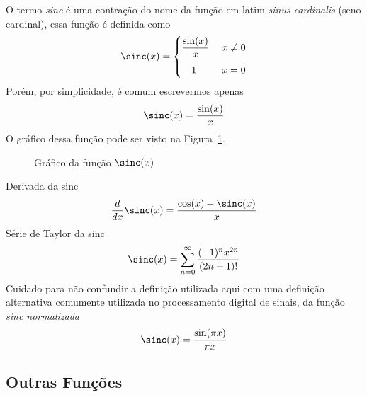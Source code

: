 O termo \emph{sinc} é uma contração do nome da função em latim
\textit{sinus cardinalis} (seno cardinal), essa função é definida como
\begin{equation}
  \label{eq:funcao_sinc}
  \sinc(x) = \begin{cases}
                \dfrac{\sin(x)}{x} & \; x \neq 0 \\[3mm]
                \quad 1            & \; x = 0
             \end{cases}
\end{equation}
Porém, por simplicidade, é comum escrevermos apenas
\[
  \sinc(x) = \frac{\sin(x)}{x}
\]
O gráfico dessa função pode ser visto na Figura~\ref{fig:functions_sinc}.

\begin{figure}
  \centering
  
  \caption{Gráfico da função $\sinc(x)$}
  \label{fig:functions_sinc}
\end{figure}

Derivada da sinc
\[
  \frac{d}{dx} \sinc(x) = \frac{\cos(x)-\sinc(x)}{x}
\]
Série de Taylor da sinc
\[
  \sinc(x) = \sum_{n=0}^{\infty} \frac{(-1)^{n} x^{2n}}{(2n+1)!}
\]
Cuidado para não confundir a definição utilizada aqui com
uma definição alternativa comumente utilizada no processamento digital de sinais,
da função \emph{sinc normalizada}
\[
  \sinc(x) = \frac{\sin(\pi x)}{\pi x}
\]

\subsection*{Outras Funções}

